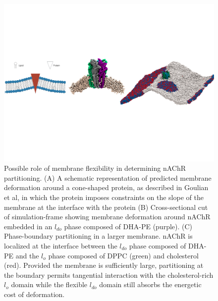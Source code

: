 \documentclass{article}
\begin{document}
\begin{figure}[t!]
	\includegraphics[width=20cm]{./F31/Curvature4.pdf}
	\caption{Possible role of membrane flexibility in determining nAChR partitioning. (A) A schematic representation of predicted membrane deformation around a cone-shaped protein, as described in Goulian et al, \cite{Goulian1996} in which the protein imposes constraints on the slope of the membrane at the interface with the protein (B) Cross-sectional cut of simulation-frame showing membrane deformation around nAChR embedded in an $l_{do}$ phase composed of DHA-PE (purple). (C) Phase-boundary partitioning in a larger membrane. nAChR is localized at the interface between the $l_{do}$ phase composed of DHA-PE and the $l_o$ phase composed of DPPC (green) and cholesterol (red). Provided the membrane is sufficiently large, partitioning at the boundary permits tangential interaction with the cholesterol-rich $l_o$ domain while the flexible $l_{do}$ domain still absorbs the energetic cost of deformation.}
	\label{fig:deform}
\end{figure}
\end{document}
